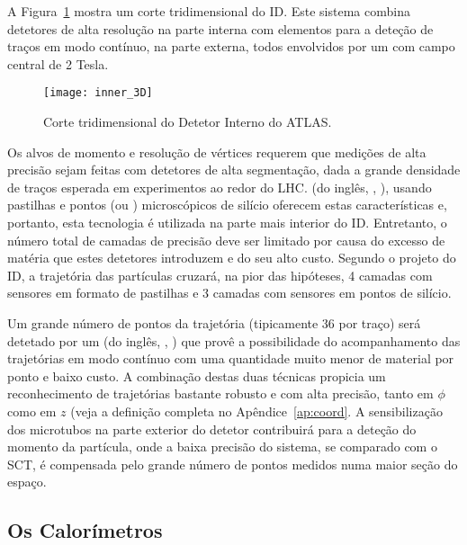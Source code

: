 A Figura~\ref{fig:atlas-id-3d} mostra um corte tridimensional do ID. Este
sistema combina detetores de alta resolução na parte interna com elementos
para a deteção de traços em modo contínuo, na parte externa, todos envolvidos
por um  com campo central de 2 Tesla.

\begin{figure}
\begin{center}
\texttt{[image: inner\_3D]}
\end{center}
\caption{Corte tridimensional do Detetor Interno do ATLAS.}
\label{fig:atlas-id-3d}
\end{figure}

Os alvos de momento e resolução de vértices requerem que medições de alta
precisão sejam feitas com detetores de alta segmentação, dada a grande
densidade de traços esperada em experimentos ao redor do LHC.  (do inglês, , ), usando pastilhas e
pontos (ou ) microscópicos de silício
oferecem estas características e, portanto, esta tecnologia é utilizada na
parte mais interior do ID. Entretanto, o número total de camadas de precisão
deve ser limitado por causa do excesso de matéria que estes detetores
introduzem e do seu alto custo. Segundo o projeto do ID, a trajetória das
partículas cruzará, na pior das hipóteses, 4 camadas com sensores em formato
de pastilhas e 3 camadas com sensores em pontos de silício.

Um grande número de pontos da trajetória (tipicamente 36 por traço) será
detetado por um  (do inglês,
, ) que provê a possibilidade do
acompanhamento das trajetórias em modo contínuo com uma quantidade muito menor
de material por ponto e baixo custo. A combinação destas duas técnicas
propicia um reconhecimento de trajetórias bastante robusto e com alta
precisão, tanto em $\phi$ como em $z$ (veja a definição completa no
Apêndice~\ref{ap:coord}. A sensibilização dos microtubos na parte
exterior do detetor contribuirá para a deteção do momento da partícula, onde a
baixa precisão do sistema, se comparado com o SCT, é compensada pelo grande
número de pontos medidos numa maior seção do espaço.

\subsection{Os Calorímetros}
\label{sec:atlas-calo}

